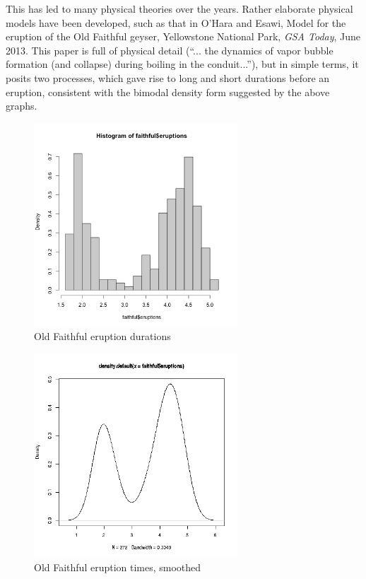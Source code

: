 \documentclass[11pt]{article}
\begin{document}
This has led to many physical theories over the years.  Rather elaborate
physical models have been developed, such as that in O'Hara and Esawi,
Model for the eruption of the Old Faithful geyser, Yellowstone National
Park, \textit{GSA Today}, June 2013.  This paper is full of physical
detail (``... the dynamics of vapor bubble formation (and collapse)
during boiling in the conduit...''), but in simple terms, it posits two
processes, which gave rise to long and short durations before an
eruption, consistent with the bimodal density form suggested by the
above graphs.

\begin{figure}[tb]
\centerline{
\includegraphics[width=3.0in]{FaithfulDuration.png}
}
\caption{Old Faithful eruption durations}
\label{faithfulhist}
\end{figure}

\begin{figure}[tb]
\centerline{
\includegraphics[width=3.0in]{FaithfulDurationSmooth.png}
}
\caption{Old Faithful eruption times, smoothed}
\label{faithfulhistsmooth}
\end{figure}
\end{document}
